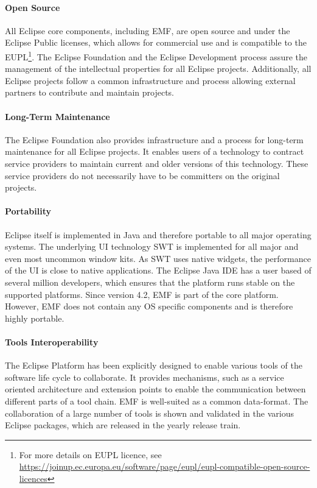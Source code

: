 \paragraph {Open Source}
All Eclipse core components, including EMF, are open source and under
the Eclipse Public licenses, which allows for commercial use and is
compatible to the EUPL\footnote{For more details on EUPL licence, see \url{https://joinup.ec.europa.eu/software/page/eupl/eupl-compatible-open-source-licences}}. The Eclipse Foundation and the Eclipse
Development process assure the management of the intellectual
properties for all Eclipse projects. Additionally, all Eclipse projects
follow a common infrastructure and process allowing external partners
to contribute and maintain projects. 

\paragraph{Long-Term Maintenance}
The Eclipse Foundation also provides infrastructure and a process for
long-term maintenance for all Eclipse projects. It enables users of a
technology to contract service providers to maintain current and older
versions of this technology. These service providers do not
necessarily have to be committers on the original projects.

\paragraph{Portability}
Eclipse itself is implemented in Java and therefore portable to all
major operating systems. The underlying UI technology SWT is
implemented for all major and even most uncommon window kits. As SWT
uses native widgets, the performance of the UI is close to native
applications. The Eclipse Java IDE has a user based of several million
developers, which ensures that the platform runs stable on the
supported platforms. Since version 4.2, EMF is part of the core
platform. However, EMF does not contain any OS specific components and
is therefore highly portable.

\paragraph{Tools Interoperability}
The Eclipse Platform has been explicitly designed to enable various
tools of the software life cycle to collaborate. It provides
mechanisms, such as a service oriented architecture and extension
points to enable the communication between different parts of a tool
chain. EMF is well-suited as a common data-format. The collaboration
of a large number of tools is shown and validated in the various
Eclipse packages, which are released in the yearly release train.

